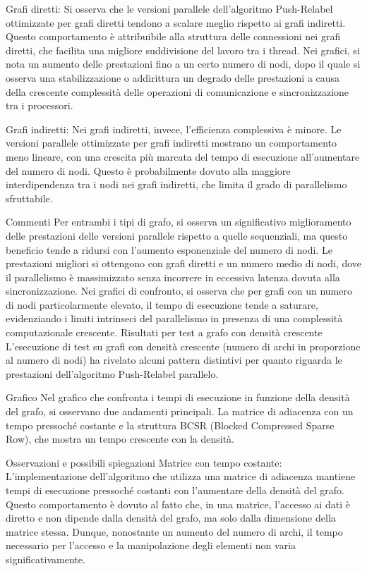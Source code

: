 Grafi diretti: Si osserva che le versioni parallele dell'algoritmo Push-Relabel ottimizzate per grafi diretti tendono a scalare meglio rispetto ai grafi indiretti. Questo comportamento è attribuibile alla struttura delle connessioni nei grafi diretti, che facilita una migliore suddivisione del lavoro tra i thread. Nei grafici, si nota un aumento delle prestazioni fino a un certo numero di nodi, dopo il quale si osserva una stabilizzazione o addirittura un degrado delle prestazioni a causa della crescente complessità delle operazioni di comunicazione e sincronizzazione tra i processori.

Grafi indiretti: Nei grafi indiretti, invece, l'efficienza complessiva è minore. Le versioni parallele ottimizzate per grafi indiretti mostrano un comportamento meno lineare, con una crescita più marcata del tempo di esecuzione all'aumentare del numero di nodi. Questo è probabilmente dovuto alla maggiore interdipendenza tra i nodi nei grafi indiretti, che limita il grado di parallelismo sfruttabile.

Commenti
Per entrambi i tipi di grafo, si osserva un significativo miglioramento delle prestazioni delle versioni parallele rispetto a quelle sequenziali, ma questo beneficio tende a ridursi con l'aumento esponenziale del numero di nodi.
Le prestazioni migliori si ottengono con grafi diretti e un numero medio di nodi, dove il parallelismo è massimizzato senza incorrere in eccessiva latenza dovuta alla sincronizzazione.
Nei grafici di confronto, si osserva che per grafi con un numero di nodi particolarmente elevato, il tempo di esecuzione tende a saturare, evidenziando i limiti intrinseci del parallelismo in presenza di una complessità computazionale crescente.
Risultati per test a grafo con densità crescente
L'esecuzione di test su grafi con densità crescente (numero di archi in proporzione al numero di nodi) ha rivelato alcuni pattern distintivi per quanto riguarda le prestazioni dell'algoritmo Push-Relabel parallelo.

Grafico
Nel grafico che confronta i tempi di esecuzione in funzione della densità del grafo, si osservano due andamenti principali. La matrice di adiacenza con un tempo pressoché costante e la struttura BCSR (Blocked Compressed Sparse Row), che mostra un tempo crescente con la densità.

Osservazioni e possibili spiegazioni
Matrice con tempo costante: L'implementazione dell'algoritmo che utilizza una matrice di adiacenza mantiene tempi di esecuzione pressoché costanti con l'aumentare della densità del grafo. Questo comportamento è dovuto al fatto che, in una matrice, l'accesso ai dati è diretto e non dipende dalla densità del grafo, ma solo dalla dimensione della matrice stessa. Dunque, nonostante un aumento del numero di archi, il tempo necessario per l'accesso e la manipolazione degli elementi non varia significativamente.

